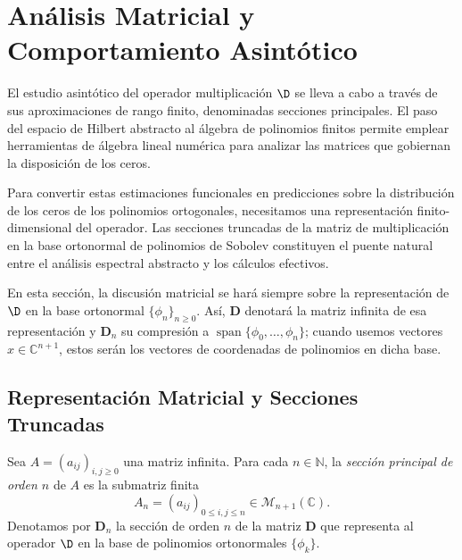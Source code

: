 
\chapter{Análisis Matricial y Comportamiento Asintótico}\label{sec:matricial}

El estudio asintótico del operador multiplicación $\D$ se lleva a cabo a través de sus aproximaciones de rango finito, denominadas secciones principales. El paso del espacio de Hilbert abstracto al álgebra de polinomios finitos permite emplear herramientas de álgebra lineal numérica para analizar las matrices que gobiernan la disposición de los ceros.

Para convertir estas estimaciones funcionales en predicciones sobre la distribución de los ceros de los polinomios ortogonales, necesitamos una representación finito-dimensional del operador. Las secciones truncadas de la matriz de multiplicación en la base ortonormal de polinomios de Sobolev constituyen el puente natural entre el análisis espectral abstracto y los cálculos efectivos.

En esta sección, la discusión matricial se hará siempre sobre la representación de $\D$ en la base ortonormal $\{\phi_n\}_{n\ge 0}$. Así, $\mathbf{D}$ denotará la matriz infinita de esa representación y $\mathbf{D}_n$ su compresión a $\operatorname{span}\{\phi_0,\dots,\phi_n\}$; cuando usemos vectores $x \in \mathbb{C}^{n+1}$, estos serán los vectores de coordenadas de polinomios en dicha base.

\section{Representación Matricial y Secciones Truncadas}

\begin{defn}\label{def:seccion_truncada}
	Sea $A = (a_{ij})_{i,j \geq 0}$ una matriz infinita. Para cada $n \in \mathbb{N}$, la \emph{sección principal de orden $n$} de $A$ es la submatriz finita
	\[
		A_n = (a_{ij})_{0 \leq i,j \leq n} \in \mathcal{M}_{n+1}(\mathbb{C}).
	\]
	Denotamos por $\mathbf{D}_n$ la sección de orden $n$ de la matriz $\mathbf{D}$ que representa al operador $\D$ en la base de polinomios ortonormales $\{\phi_k\}$.
\end{defn}

